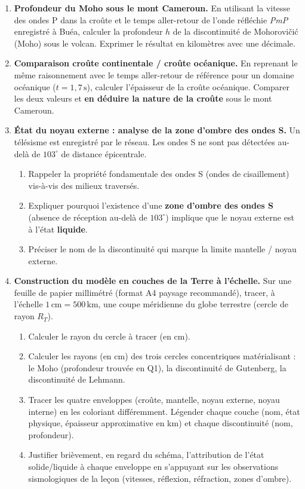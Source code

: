 \documentclass[11pt]{article}
\begin{document}
\begin{enumerate}
    \item \textbf{Profondeur du Moho sous le mont Cameroun.} 
    En utilisant la vitesse des ondes P dans la croûte et le temps aller-retour de l'onde réfléchie \emph{PmP} enregistré à Buéa, calculer la profondeur $h$ de la discontinuité de Mohorovičić (Moho) sous le volcan. Exprimer le résultat en kilomètres avec une décimale.
    
    \item \textbf{Comparaison croûte continentale / croûte océanique.} 
    En reprenant le même raisonnement avec le temps aller-retour de référence pour un domaine océanique ($t = 1,7\,\text{s}$), calculer l'épaisseur de la croûte océanique. Comparer les deux valeurs et \textbf{en déduire la nature de la croûte} sous le mont Cameroun.
    
    \item \textbf{État du noyau externe : analyse de la zone d'ombre des ondes S.} 
    Un télésisme est enregistré par le réseau. Les ondes S ne sont pas détectées au-delà de $103^\circ$ de distance épicentrale.
    \begin{enumerate}
        \item Rappeler la propriété fondamentale des ondes S (ondes de cisaillement) vis-à-vis des milieux traversés.
        \item Expliquer pourquoi l'existence d'une \textbf{zone d'ombre des ondes S} (absence de réception au-delà de $103^\circ$) implique que le noyau externe est à l'état \textbf{liquide}.
        \item Préciser le nom de la discontinuité qui marque la limite mantelle / noyau externe.
    \end{enumerate}
    
    \item \textbf{Construction du modèle en couches de la Terre à l'échelle.} 
    Sur une feuille de papier millimétré (format A4 paysage recommandé), tracer, à l'échelle $1\,\text{cm} = 500\,\text{km}$, une coupe méridienne du globe terrestre (cercle de rayon $R_T$). 
    \begin{enumerate}
        \item Calculer le rayon du cercle à tracer (en cm).
        \item Calculer les rayons (en cm) des trois cercles concentriques matérialisant : le Moho (profondeur trouvée en Q1), la discontinuité de Gutenberg, la discontinuité de Lehmann.
        \item Tracer les quatre enveloppes (croûte, mantelle, noyau externe, noyau interne) en les coloriant différemment. Légender chaque couche (nom, état physique, épaisseur approximative en km) et chaque discontinuité (nom, profondeur).
        \item Justifier brièvement, en regard du schéma, l'attribution de l'état solide/liquide à chaque enveloppe en s'appuyant sur les observations sismologiques de la leçon (vitesses, réflexion, réfraction, zones d'ombre).
    \end{enumerate}
\end{enumerate}
\end{document}

